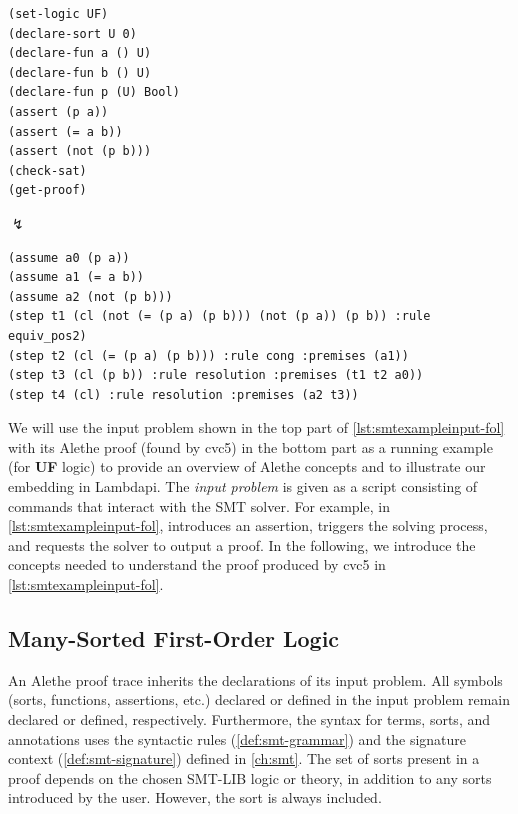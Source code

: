 \begin{lstlisting}[language=SMT]
(set-logic UF)
(declare-sort U 0)
(declare-fun a () U)
(declare-fun b () U)
(declare-fun p (U) Bool)
(assert (p a))
(assert (= a b))
(assert (not (p b)))
(check-sat)
(get-proof)
\end{lstlisting}

\begin{center}
$\lightning$
\end{center}

\begin{lstlisting}[language=SMT,caption={[Running example and Alethe proof]Running example: an SMT problem and its Alethe proof found by cvc5.},label={lst:smtexampleinput-fol}]
(assume a0 (p a))
(assume a1 (= a b))
(assume a2 (not (p b)))
(step t1 (cl (not (= (p a) (p b))) (not (p a)) (p b)) :rule equiv_pos2)
(step t2 (cl (= (p a) (p b))) :rule cong :premises (a1))
(step t3 (cl (p b)) :rule resolution :premises (t1 t2 a0))
(step t4 (cl) :rule resolution :premises (a2 t3))
\end{lstlisting}


We will use the input problem shown in the top part of \cref{lst:smtexampleinput-fol} with its Alethe proof (found by cvc5) in the bottom part as a running example (for \textbf{UF} logic) to provide an overview of Alethe concepts and to illustrate our embedding in Lambdapi.
The \emph{input problem} is given as a script consisting of commands that interact with the SMT solver.
For example, in \cref{lst:smtexampleinput-fol},  introduces an assertion,  triggers the solving process, and  requests the solver to output a proof.
In the following, we introduce the concepts needed to understand the proof produced by cvc5 in \cref{lst:smtexampleinput-fol}.

\subsection{Many-Sorted First-Order Logic}

An Alethe proof trace inherits the declarations of its input problem. All symbols (sorts, functions, assertions, etc.) declared or defined in the input problem remain declared or defined, respectively.
Furthermore, the syntax for terms, sorts, and annotations uses the syntactic rules (\cref{def:smt-grammar}) and the signature context (\cref{def:smt-signature}) defined in \cref{ch:smt}.
The set of sorts present in a proof depends on the chosen SMT-LIB logic or theory, in addition to any sorts introduced by the user.
However, the sort  is always included.

